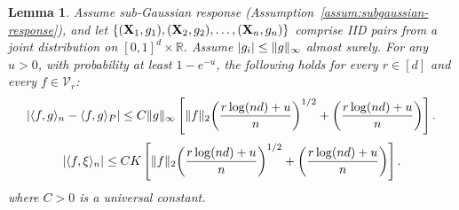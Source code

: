 \documentclass[11pt]{article}
\theoremstyle{plain}
\newtheorem{lemma}[theorem]{Lemma}
\theoremstyle{definition}
\theoremstyle{remark}
\theoremstyle{plain}
\newcommand{\bX}{\mathbf{X}}
\DeclarePairedDelimiter{\braces}{\lbrace}{\rbrace}
\DeclarePairedDelimiter{\paren}{(}{)}
\DeclarePairedDelimiter{\abs}{|}{|}
\DeclarePairedDelimiter{\norm}{\|}{\|}
\DeclarePairedDelimiter{\inprod}{\langle}{\rangle}
\newcommand{\R}{\mathbb{R}}
\newcommand{\partfunc}{\mathcal{V}}
\newcommand{\1}{\mathbbm{1}}
\begin{document}
\begin{lemma}\label{lem:final_conc}
    Assume sub-Gaussian response
    (Assumption~\ref{assum:subgaussian-response}), and let
    $\braces*{(\bX_1,g_1),(\bX_2,g_2),\ldots,(\bX_n,g_n)}$ comprise
    IID pairs from a joint distribution on $[0,1]^d\times\R$. Assume
    $|g_i|\le \norm{g}_\infty$ almost surely.
    For any $u>0$, with probability at least $1-e^{-u}$, the following holds for every $r\in [d]$ and every $f \in \partfunc_r$:
    \begin{equation}
    \label{eq:function_multiplier_final_conc}
        \abs*{\inprod{f,g}_n - \inprod{f,g}_{P}} \leq C\norm{g}_\infty\left[\norm{f}_2\paren*{\frac{r\log(nd) + u}{n}}^{1/2} + \paren*{\frac{r\log(nd) + u}{n}}\right].
	\end{equation}
    \begin{equation}
    \label{eq:function_multiplier_final_conc_noise}
        \abs*{\inprod{f,\xi}_n} \leq CK\left[\norm{f}_2\paren*{\frac{r\log(nd) + u}{n}}^{1/2} + \paren*{\frac{r\log(nd) + u}{n}}\right].
	\end{equation}
    where $C>0$ is a universal constant.
\end{lemma}
\end{document}
